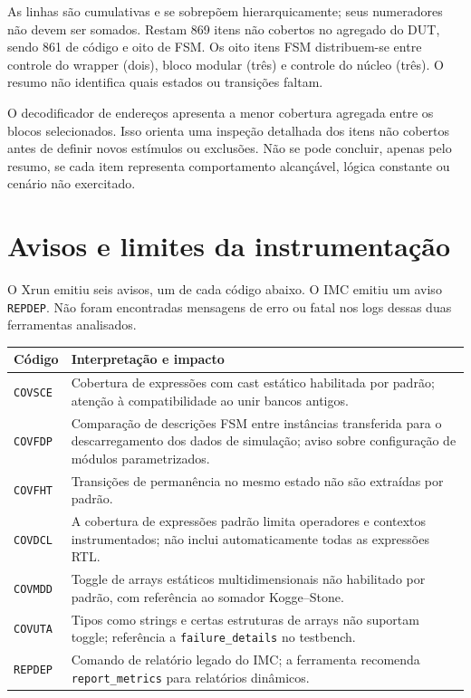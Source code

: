 \documentclass[11pt,a4paper]{article}
\begin{document}
As linhas são cumulativas e se sobrepõem hierarquicamente; seus numeradores
não devem ser somados. Restam 869 itens não cobertos no agregado do DUT,
sendo 861 de código e oito de FSM. Os oito itens FSM distribuem-se entre
controle do wrapper (dois), bloco modular (três) e controle do núcleo (três).
O resumo não identifica quais estados ou transições faltam.

O decodificador de endereços apresenta a menor cobertura agregada entre
os blocos selecionados. Isso orienta uma inspeção detalhada dos itens
não cobertos antes de definir novos estímulos ou exclusões. Não se pode
concluir, apenas pelo resumo, se cada item representa comportamento
alcançável, lógica constante ou cenário não exercitado.

\section{Avisos e limites da instrumentação}
O Xrun emitiu seis avisos, um de cada código abaixo. O IMC emitiu um aviso
\texttt{REPDEP}. Não foram encontradas mensagens de erro ou fatal nos
logs dessas duas ferramentas analisados.

\begin{center}
\begin{tabularx}{\linewidth}{@{}lX@{}}
\toprule
Código & Interpretação e impacto \\
\midrule
\texttt{COVSCE} & Cobertura de expressões com cast estático habilitada por padrão; atenção à compatibilidade ao unir bancos antigos. \\
\texttt{COVFDP} & Comparação de descrições FSM entre instâncias transferida para o descarregamento dos dados de simulação; aviso sobre configuração de módulos parametrizados. \\
\texttt{COVFHT} & Transições de permanência no mesmo estado não são extraídas por padrão. \\
\texttt{COVDCL} & A cobertura de expressões padrão limita operadores e contextos instrumentados; não inclui automaticamente todas as expressões RTL. \\
\texttt{COVMDD} & Toggle de arrays estáticos multidimensionais não habilitado por padrão, com referência ao somador Kogge--Stone. \\
\texttt{COVUTA} & Tipos como strings e certas estruturas de arrays não suportam toggle; referência a \texttt{failure\_details} no testbench. \\
\texttt{REPDEP} & Comando de relatório legado do IMC; a ferramenta recomenda \texttt{report\_metrics} para relatórios dinâmicos. \\
\bottomrule
\end{tabularx}
\end{center}
\end{document}

